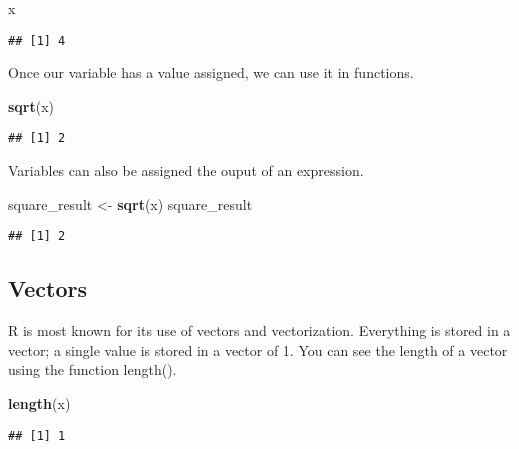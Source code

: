 \documentclass[]{article}
\newenvironment{Shaded}{\begin{snugshade}}{\end{snugshade}}
\newcommand{\KeywordTok}[1]{\textcolor[rgb]{0.13,0.29,0.53}{\textbf{#1}}}
\newcommand{\StringTok}[1]{\textcolor[rgb]{0.31,0.60,0.02}{#1}}
\newcommand{\NormalTok}[1]{#1}
\begin{document}
\begin{Shaded}
\begin{Highlighting}[]
\NormalTok{x}
\end{Highlighting}
\end{Shaded}

\begin{verbatim}
## [1] 4
\end{verbatim}

Once our variable has a value assigned, we can use it in functions.

\begin{Shaded}
\begin{Highlighting}[]
\KeywordTok{sqrt}\NormalTok{(x)}
\end{Highlighting}
\end{Shaded}

\begin{verbatim}
## [1] 2
\end{verbatim}

Variables can also be assigned the ouput of an expression.

\begin{Shaded}
\begin{Highlighting}[]
\NormalTok{square_result <-}\StringTok{ }\KeywordTok{sqrt}\NormalTok{(x)}
\NormalTok{square_result}
\end{Highlighting}
\end{Shaded}

\begin{verbatim}
## [1] 2
\end{verbatim}

\subsection{Vectors}\label{vectors}

R is most known for its use of vectors and vectorization. Everything is
stored in a vector; a single value is stored in a vector of 1. You can
see the length of a vector using the function length().

\begin{Shaded}
\begin{Highlighting}[]
\KeywordTok{length}\NormalTok{(x)}
\end{Highlighting}
\end{Shaded}

\begin{verbatim}
## [1] 1
\end{verbatim}
\end{document}
